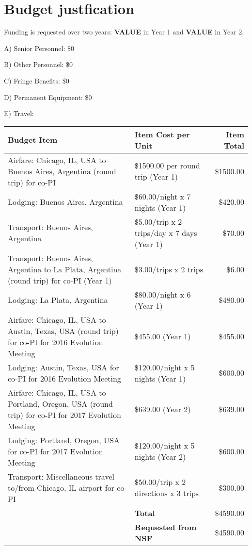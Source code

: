 \documentclass[11pt,letterpaper]{article}
\begin{document}
\setcounter{secnumdepth}{0}
\section{Budget justfication}

Funding is requested over two years: \textbf{VALUE} in Year 1 and \textbf{VALUE} in Year 2.

A) Senior Personnel: \$0

B) Other Personnel: \$0

C) Fringe Benefits: \$0

D) Permanent Equipment: \$0

E) Travel:

\begin{tabular}[H]{p{7.5cm} p{4.5cm} r}
  Budget Item & Item Cost per Unit & Item Total \\
  \hline
  Airfare: Chicago, IL, USA to Buenos Aires, Argentina (round trip) for co-PI & \$1500.00 per round trip (Year 1) & \$1500.00 \\
  Lodging: Buenos Aires, Argentina & \$60.00/night x 7 nights (Year 1) & \$420.00 \\
  Transport: Buenos Aires, Argentina & \$5.00/trip x 2 trips/day x 7 days (Year 1) & \$70.00 \\
  Transport: Buenos Aires, Argentina to La Plata, Argentina (round trip) for co-PI (Year 1) & \$3.00/trips x 2 trips & \$6.00 \\
  Lodging: La Plata, Argentina & \$80.00/night x 6 (Year 1) & \$480.00 \\
  Airfare: Chicago, IL, USA to Austin, Texas, USA (round trip) for co-PI for 2016 Evolution Meeting & \$455.00 (Year 1) & \$455.00 \\
  Lodging: Austin, Texas, USA for co-PI for 2016 Evolution Meeting & \$120.00/night x 5 nights (Year 1) & \$600.00 \\
  Airfare: Chicago, IL, USA to Portland, Oregon, USA (round trip) for co-PI for 2017 Evolution Meeting & \$639.00 (Year 2) & \$639.00 \\
  Lodging: Portland, Oregon, USA for co-PI for 2017 Evolution Meeting & \$120.00/night x 5 nights (Year 2) & \$600.00 \\
  Transport: Miscellaneous travel to/from Chicago, IL airport for co-PI & \$50.00/trip x 2 directions x 3 trips & \$300.00 \\
  & \textbf{Total} & \$4590.00 \\
  & \textbf{Requested from NSF} & \$4590.00
\end{tabular}
\end{document}
